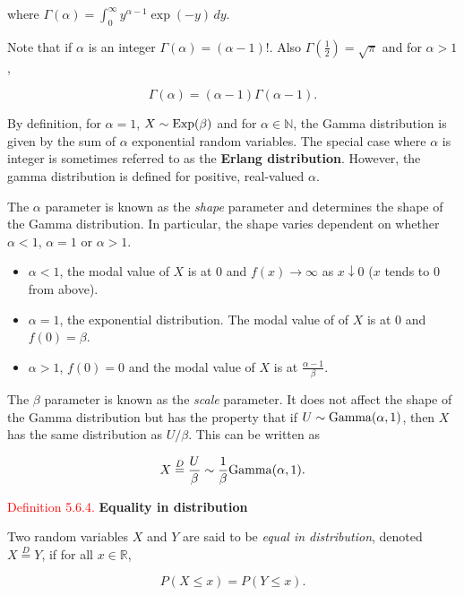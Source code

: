 \documentclass[
]{book}
\providecommand{\tightlist}{%
  \setlength{\itemsep}{0pt}\setlength{\parskip}{0pt}}
\begin{document}
where \(\Gamma (\alpha) = \int_0^\infty y^{\alpha -1} \exp(-y) \, dy\).

Note that if \(\alpha\) is an integer \(\Gamma (\alpha) = (\alpha -1)!\). Also \(\Gamma \left( \frac{1}{2} \right) = \sqrt{\pi}\) and for
\(\alpha > 1\),

\[ \Gamma (\alpha) = (\alpha -1) \Gamma (\alpha -1). \]

By definition, for \(\alpha =1\), \(X \sim {\rm Exp} (\beta)\) and for \(\alpha \in \mathbb{N}\), the Gamma distribution is given by the sum of \(\alpha\) exponential random variables. The special case where \(\alpha\) is integer is sometimes referred to as the \textbf{Erlang distribution}. However, the gamma distribution is defined for positive, real-valued \(\alpha\).

The \(\alpha\) parameter is known as the \emph{shape} parameter and determines the shape of the Gamma distribution. In particular, the shape varies dependent on whether \(\alpha <1\), \(\alpha =1\) or \(\alpha >1\).

\begin{itemize}
\tightlist
\item
  \(\alpha <1\), the modal value of \(X\) is at 0 and \(f(x) \to \infty\) as \(x \downarrow 0\) (\(x\) tends to 0 from above).\\
\item
  \(\alpha =1\), the exponential distribution. The modal value of of \(X\) is at 0 and \(f(0)=\beta\).\\
\item
  \(\alpha >1\), \(f(0)=0\) and the modal value of \(X\) is at \(\frac{\alpha-1}{\beta}\).
\end{itemize}

The \(\beta\) parameter is known as the \emph{scale} parameter. It does not affect the shape of the Gamma distribution but has the property that if \(U \sim {\rm Gamma} (\alpha,1)\), then \(X\) has the same distribution as \(U/\beta\). This can be written as

\[ X \stackrel{D}{=} \frac{U}{\beta} \sim \frac{1}{\beta} {\rm Gamma} (\alpha,1). \]

\leavevmode{}%
\textcolor{red}{Definition 5.6.4.}
{\textbf{Equality in distribution}}

Two random variables \(X\) and \(Y\) are said to be \emph{equal in distribution}, denoted \(X \stackrel{D}{=} Y\), if for all \(x \in \mathbb{R}\),

\[ P(X \leq x) = P(Y \leq x). \]
\end{document}

